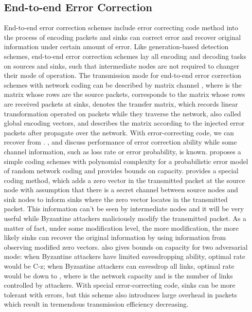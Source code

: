 \documentclass[conference]{IEEEtran}
\begin{document}
\subsection{End-to-end Error Correction}
End-to-end error correction schemes include error correcting code method into the process of encoding packets and sinks can correct error and recover original information under certain amount of error. Like generation-based detection schemes, end-to-end error correction schemes lay all encoding and decoding tasks on sources and sinks, such that intermediate nodes are not required to changer their mode of operation. The transmission mode for end-to-end error correction schemes with network coding can be described by matrix channel {\boldmath}, where {\boldmath} is the matrix whose rows are the source packets, {\boldmath} corresponds to the matrix whose rows are received packets at sinks, {\boldmath} denotes the transfer matrix, which records linear transformation operated on packets while they traverse the network, also called global encoding vectors, and {\boldmath} describes the matrix according to the injected error packets after propagate over the network. With error-correcting code, we can recover {\boldmath} from {\boldmath}. \cite{codingforerr}, \cite{rank-metric} and \cite{usingrank-metric} discuss performance of error correction ability while some channel information, such as loss rate or error probability, is known. \cite{capacityforRNC} proposes a simple coding schemes with polynomial complexity for a probabilistic error model of random network coding and provides bounds on capacity. \cite{resilient} provides a special coding method, which adds a zero vector in the transmitted packet at the source node with assumption that there is a secret channel between source nodes and sink nodes to inform sinks where the zero vector locates in the transmitted packet. This information can't be seen by intermediate nodes and it will be very useful while Byzantine attackers maliciously modify the transmitted packet. As a matter of fact, under some modification level, the more modification, the more likely sinks can recover the original information by using information from observing modified zero vectors. \cite{resilient} also gives bounds on capacity for two adversarial mode: when Byzantine attackers have limited eavesdropping ability, optimal rate would be C-z; when Byzantine attackers can eavesdrop all links, optimal rate would be down to , where  is the network capacity and  is the number of links controlled by attackers. With special error-correcting code, sinks can be more tolerant with errors, but this scheme also introduces large overhead in packets which result in tremendous transmission efficiency decreasing.
\end{document}
